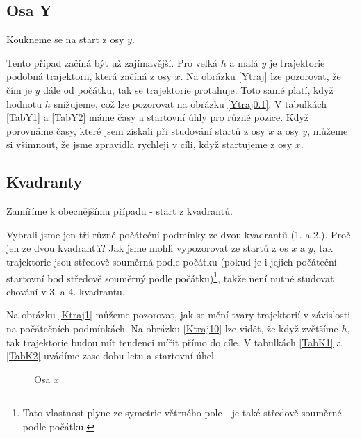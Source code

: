 \documentclass[reqno, a4paper]{amsart}
\numberwithin{equation}{section}
\begin{document}
\subsection{Osa Y}
\label{sec: OsaY}

Koukneme se na start z osy $y$.

Tento případ začíná být už zajímavější. Pro velká $h$ a malá $y$ je trajektorie podobná trajektorii, která začíná z osy $x$. Na obrázku \eqref{Ytraj} lze pozorovat, že čím je $y$ dále od počátku, tak se trajektorie protahuje. Toto samé platí, když hodnotu $h$ snižujeme, což lze pozorovat na obrázku \eqref{Ytraj0.1}. V tabulkách \eqref{TabY1} a \eqref{TabY2} máme časy a startovní úhly pro různé pozice. Když porovnáme časy, které jsem získali při studování startů z osy $x$ a osy $y$, můžeme si všimnout, že jsme zpravidla rychleji v cíli, když startujeme z osy $x$. 
\subsection{Kvadranty}
\label{sec: Kvad}
Zamíříme k obecnějšímu případu - start z kvadrantů.

Vybrali jsme jen tři různé počáteční podmínky ze dvou kvadrantů (1. a 2.). Proč jen ze dvou kvadrantů? Jak jsme mohli vypozorovat ze startů z os $x$ a $y$, tak trajektorie jsou středově souměrná podle počátku (pokud je i jejich počáteční startovní bod středově souměrný podle počátku)\footnote{Tato vlastnost plyne ze symetrie větrného pole - je také středově souměrné podle počátku.}, takže není nutné studovat chování v 3. a 4. kvadrantu.

Na obrázku \eqref{Ktraj1} můžeme pozorovat, jak se mění tvary trajektorií v závislosti na počátečních podmínkách. Na obrázku \eqref{Ktraj10} lze vidět, že když zvětšíme $h$, tak trajektorie budou mít tendenci mířit přímo do cíle. V tabulkách \eqref{TabK1} a \eqref{TabK2} uvádíme zase dobu letu a startovní úhel.


\begin{figure}[h]
  \centering
  \qquad
\caption{Osa $x$}
\end{figure}
\end{document}
